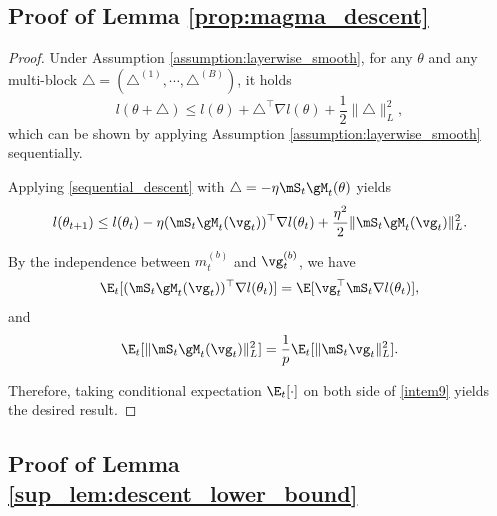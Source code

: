 \documentclass[11pt, a4paper, twocolumn, copyright, goog]{google}
\theoremstyle{plain}
\theoremstyle{definition}
\theoremstyle{remark}
\begin{document}
\subsection{Proof of Lemma \ref{prop:magma_descent}}
\begin{proof}
    
    Under Assumption \ref{assumption:layerwise_smooth}, for any $\theta$ and any multi-block $\triangle = (\triangle^{(1)}, \cdots, \triangle^{(B)})$, it holds
    \begin{equation} \label{sequential_descent}
        l(\theta + \triangle) \leq l(\theta) + \triangle^\top \nabla l(\theta) + \frac{1}{2} \| \triangle \|_L^2,
    \end{equation}
    which can be shown by applying Assumption \ref{assumption:layerwise_smooth} sequentially.


    Applying \eqref{sequential_descent} with $\triangle = -\eta \mS_t \gM_t(\theta)$ yields
    \begin{equation} \label{intem9}
        l(\theta_{t+1})
            \leq l(\theta_t) - \eta (\mS_t \gM_t(\vg_t))^\top \nabla l(\theta_t) + \frac{\eta^2}{2} \| \mS_t \gM_t(\vg_t) \|_L^2.
    \end{equation}
    
    By the independence between $m_{t}^{(b)}$ and $\vg_t^{(b)}$, we have 
    \begin{equation}
        \E_t [(\mS_t \gM_t(\vg_t))^\top \nabla l(\theta_t)] = \E [\vg_t^\top \mS_t \nabla l(\theta_t)],
    \end{equation}
    and
    \begin{equation}
        \E_t [\| \mS_t \gM_t(\vg_t) \|_L^2] = \frac{1}{p} \E_t [\| \mS_t \vg_t \|_L^2].
    \end{equation}
    
    Therefore, taking conditional expectation $\E_t [\cdot]$ on both side of \eqref{intem9} yields the desired result.
\end{proof}


\subsection{Proof of Lemma \ref{sup_lem:descent_lower_bound}}
\end{document}
